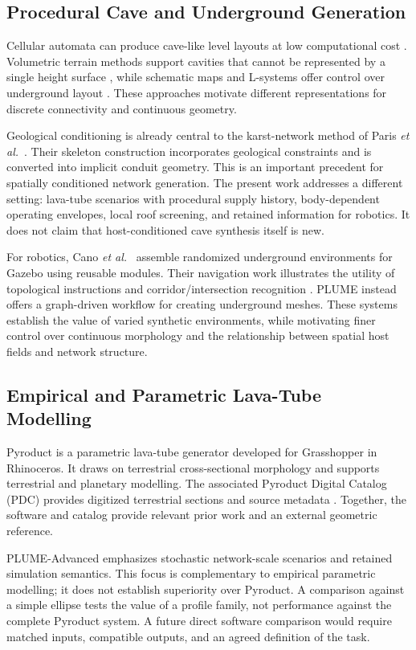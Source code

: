\documentclass[conference]{IEEEtran}
\begin{document}
\subsection{Procedural Cave and Underground Generation}
Cellular automata can produce cave-like level layouts at low computational cost \cite{johnson2010}. Volumetric terrain methods support cavities that cannot be represented by a single height surface \cite{santamaria2014}, while schematic maps and L-systems offer control over underground layout \cite{antoniuk2016}. These approaches motivate different representations for discrete connectivity and continuous geometry.

Geological conditioning is already central to the karst-network method of Paris \emph{et al.}\ \cite{paris2021}. Their skeleton construction incorporates geological constraints and is converted into implicit conduit geometry. This is an important precedent for spatially conditioned network generation. The present work addresses a different setting: lava-tube scenarios with procedural supply history, body-dependent operating envelopes, local roof screening, and retained information for robotics. It does not claim that host-conditioned cave synthesis itself is new.

For robotics, Cano \emph{et al.}\ \cite{cano_gazebo} assemble randomized underground environments for Gazebo using reusable modules. Their navigation work illustrates the utility of topological instructions and corridor/intersection recognition \cite{cano_navigation}. PLUME \cite{plume2025} instead offers a graph-driven workflow for creating underground meshes. These systems establish the value of varied synthetic environments, while motivating finer control over continuous morphology and the relationship between spatial host fields and network structure.

\subsection{Empirical and Parametric Lava-Tube Modelling}
Pyroduct \cite{pyroduct2026} is a parametric lava-tube generator developed for Grasshopper in Rhinoceros. It draws on terrestrial cross-sectional morphology and supports terrestrial and planetary modelling. The associated Pyroduct Digital Catalog (PDC) provides digitized terrestrial sections and source metadata \cite{pdc2025}. Together, the software and catalog provide relevant prior work and an external geometric reference.

PLUME-Advanced emphasizes stochastic network-scale scenarios and retained simulation semantics. This focus is complementary to empirical parametric modelling; it does not establish superiority over Pyroduct. A comparison against a simple ellipse tests the value of a profile family, not performance against the complete Pyroduct system. A future direct software comparison would require matched inputs, compatible outputs, and an agreed definition of the task.
\end{document}
